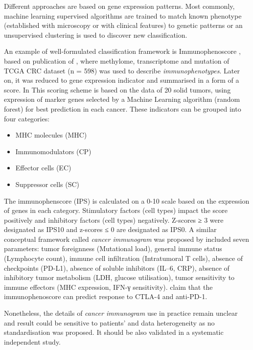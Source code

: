 \documentclass[12pt,]{book}
\providecommand{\tightlist}{%
  \setlength{\itemsep}{0pt}\setlength{\parskip}{0pt}}
\theoremstyle{definition}
\theoremstyle{definition}
\theoremstyle{definition}
\theoremstyle{remark}
\begin{document}
Different approaches are based on gene expression patterns. Most
commonly, machine learning supervised algorithms are trained to match
known phenotype (established with microscopy or with clinical features)
to genetic patterns or an unsupervised clustering is used to discover
new classification.

An example of well-formulated classification framework is
Immunophenoscore \citep{Charoentong2017}, based on publication of
\citet{Angelova2015}, where methylome, transcriptome and mutation of
TCGA CRC dataset (n = 598) was used to describe \emph{immunophenotypes}.
Later on, it was reduced to gene expression indicator and summarised in
a form of a score. In This scoring scheme is based on the data of 20
solid tumors, using expression of marker genes selected by a Machine
Learning algorithm (random forest) for best prediction in each cancer.
These indicators can be grouped into four categories:

\begin{itemize}
\tightlist
\item
  MHC molecules (MHC)
\item
  Immunomodulators (CP)
\item
  Effector cells (EC)
\item
  Suppressor cells (SC)
\end{itemize}

The immunophenscore (IPS) is calculated on a 0-10 scale based on the
expression of genes in each category. Stimulatory factors (cell types)
impact the score positively and inhibitory factors (cell types)
negatively. Z-scores ≥ 3 were designated as IPS10 and z-scores ≤ 0 are
designated as IPS0. A similar conceptual framework called \emph{cancer
immunogram} was proposed by \citet{Blank2016} included seven parameters:
tumor foreignness (Mutational load), general immune status (Lymphocyte
count), immune cell infiltration (Intratumoral T cells), absence of
checkpoints (PD-L1), absence of soluble inhibitors (IL--6, CRP), absence
of inhibitory tumor metabolism (LDH, glucose utilisation), tumor
sensitivity to immune effectors (MHC expression, IFN-γ sensitivity).
\citet{Charoentong2017} claim that the immunophenoscore can predict
response to CTLA-4 and anti-PD-1.

Nonetheless, the details of \emph{cancer immunogram} use in practice
remain unclear and result could be sensitive to patients' and data
heterogeneity as no standardisation was proposed. It should be also
validated in a systematic independent study.
\end{document}
